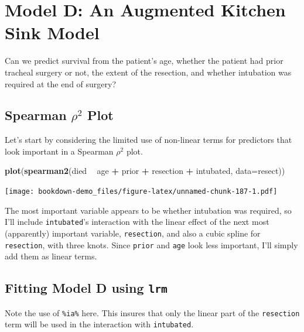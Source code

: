 \documentclass[]{book}
\newenvironment{Shaded}{\begin{snugshade}}{\end{snugshade}}
\newcommand{\KeywordTok}[1]{\textcolor[rgb]{0.13,0.29,0.53}{\textbf{#1}}}
\newcommand{\DataTypeTok}[1]{\textcolor[rgb]{0.13,0.29,0.53}{#1}}
\newcommand{\StringTok}[1]{\textcolor[rgb]{0.31,0.60,0.02}{#1}}
\newcommand{\OperatorTok}[1]{\textcolor[rgb]{0.81,0.36,0.00}{\textbf{#1}}}
\newcommand{\NormalTok}[1]{#1}
\theoremstyle{definition}
\theoremstyle{definition}
\theoremstyle{definition}
\theoremstyle{remark}
\begin{document}
\section{Model D: An Augmented Kitchen Sink
Model}\label{model-d-an-augmented-kitchen-sink-model}

Can we predict survival from the patient's age, whether the patient had
prior tracheal surgery or not, the extent of the resection, and whether
intubation was required at the end of surgery?

\subsection{\texorpdfstring{Spearman \(\rho^2\)
Plot}{Spearman \textbackslash{}rho\^{}2 Plot}}\label{spearman-rho2-plot}

Let's start by considering the limited use of non-linear terms for
predictors that look important in a Spearman \(\rho^2\) plot.

\begin{Shaded}
\begin{Highlighting}[]
\KeywordTok{plot}\NormalTok{(}\KeywordTok{spearman2}\NormalTok{(died }\OperatorTok{~}\StringTok{ }\NormalTok{age }\OperatorTok{+}\StringTok{ }\NormalTok{prior }\OperatorTok{+}\StringTok{ }\NormalTok{resection }\OperatorTok{+}\StringTok{ }\NormalTok{intubated, }\DataTypeTok{data=}\NormalTok{resect))}
\end{Highlighting}
\end{Shaded}

\texttt{[image: bookdown-demo\_files/figure-latex/unnamed-chunk-187-1.pdf]}

The most important variable appears to be whether intubation was
required, so I'll include \texttt{intubated}'s interaction with the
linear effect of the next most (apparently) important variable,
\texttt{resection}, and also a cubic spline for \texttt{resection}, with
three knots. Since \texttt{prior} and \texttt{age} look less important,
I'll simply add them as linear terms.

\subsection{\texorpdfstring{Fitting Model D using
\texttt{lrm}}{Fitting Model D using lrm}}\label{fitting-model-d-using-lrm}

Note the use of \texttt{\%ia\%} here. This insures that only the linear
part of the \texttt{resection} term will be used in the interaction with
\texttt{intubated}.
\end{document}
